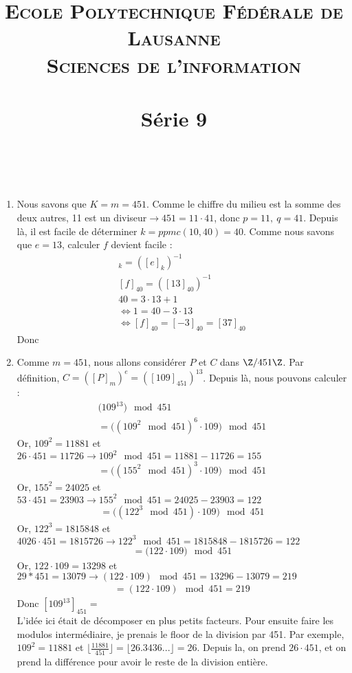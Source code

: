 \documentclass[10p,a4paper]{scrartcl}
\title{	
\normalfont \normalsize 
\textsc{Ecole Polytechnique Fédérale de Lausanne} \\ [25pt] %
\textsc{Sciences de l'information}\\ [0pt] %
\horrule{0.5pt} \\[0.4cm] %
\huge Série 9 \\ %
\horrule{2pt} \\[0.5cm] %
}
\date{}
\begin{document}
\maketitle
\setcounter{section}{9}
\subsection{}
\begin{enumerate}
	\item	Nous savons que $K = m = 451$. Comme le chiffre du milieu est la somme des deux autres, 11 est un diviseur$ \to 451 = 11\cdot41$, donc $p = 11,\ q = 41$. Depuis là, il est facile de déterminer $k = ppmc(10,40) = 40$. Comme nous savons que $e = 13$, calculer $f$ devient facile : 
			\begin{align*}
				[f]_k = ([e]_k)^{-1}\\
				[f]_{40} = ([13]_{40})^{-1}\\
				40 = 3\cdot 13 + 1\\
				\iff 1 = 40 - 3\cdot 13\\
				\iff [f]_{40} = [-3]_{40} = [37]_{40}
			\end{align*}
			Donc 
			
	\item	Comme $m = 451$, nous allons considérer $P$ et $C$ dans $\Z/451\Z$. Par définition, $C = ([P]_m)^e = ([109]_{451})^{13}$. Depuis là, nous pouvons calculer :
			\begin{align*}
				\big(109^{13}\big) \mod 451\\
				= \big((109^2 \mod 451)^6 \cdot 109 \big) \mod 451
			\end{align*}
			Or, $109^2 = 11881$ et $26\cdot 451 = 11726 \to 109^2 \mod 451 = 11881-11726 = 155$
			\begin{align*}
				= \big((155^2 \mod 451)^3 \cdot 109) \mod 451
			\end{align*}
			Or, $155^2 = 24025$ et $53\cdot 451 = 23903 \to 155^2 \mod 451 = 24025-23903=122$
			\begin{align*}
				= \big((122^3 \mod 451) \cdot 109\big) \mod 451
			\end{align*}
			Or, $122^3 = 1815848$ et $4026\cdot 451 = 1815726 \to 122^3 \mod 451 = 1815848-1815726 = 122$
			\begin{align*}
			 = \big(122 \cdot 109) \mod 451
			\end{align*}
			Or, $122\cdot109 = 13298$ et $29*451 = 13079 \to (122\cdot109) \mod 451 = 13296 - 13079 = 219$
			\begin{align*}
			 =(122\cdot 109) \mod 451 = 219
			\end{align*}
			Donc $[109^{13}]_{451} =$  \\
			L'idée ici était de décomposer en plus petits facteurs. Pour ensuite faire les modulos intermédiaire, je prenais le floor de la division par 451. Par exemple, $109^2 = 11881$ et $\lfloor \frac{11881}{451}\rfloor = \lfloor 26.3436...\rfloor = 26$. Depuis la, on prend $26 \cdot 451$, et on prend la différence pour avoir le reste de la division entière.
			

\end{enumerate}
\end{document}
